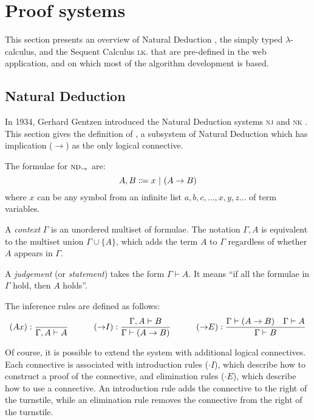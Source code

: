 \section{Proof systems}
\label{background:proof-systems}
This section presents an overview of Natural Deduction \ndt{}, the simply typed $\lambda$-calculus, and the Sequent Calculus \textsc{lk}. that are pre-defined in the web application, and on which most of the algorithm development is based.

\subsection{Natural Deduction \texorpdfstring{\ndt{}}{with implication}}
In 1934, Gerhard Gentzen introduced the Natural Deduction systems \textsc{nj} and \textsc{nk} \cite{gentzen:1969}. This section gives the definition of \ndt{}, a subsystem of Natural Deduction which has implication ($\to$) as the only logical connective.
\begin{definition}
    The formulae for $\textsc{nd}_\to$ are:
    \[
        A, B \Coloneqq x \ |\  (A \to B)
    \]
    where $x$ can be any symbol from an infinite list $a, b, c, \ldots, x, y, z \ldots$ of term variables.
\end{definition}
\begin{definition}
    A \textit{context} $\Gamma$ is an unordered multiset of formulae. The notation $\Gamma, A$ is equivalent to the multiset union $\Gamma \cup \{ A \}$, which adds the term $A$ to $\Gamma$ regardless of whether $A$ appears in $\Gamma$.
\end{definition}
\begin{definition}
    A \textit{judgement} (or \textit{statement}) takes the form $\Gamma \vdash A$. It means ``if all the formulae in $\Gamma$ hold, then $A$ holds''.
\end{definition}
\begin{definition}
    The inference rules are defined as follows:
    {
        \derivationfont
        \[
            (Ax): \frac{}{\Gamma, A \vdash A} \quad\quad\quad (\mathord{\to} I): \frac{\Gamma, A \vdash B}{\Gamma \vdash (A \to B)} \quad\quad\quad (\mathord{\to} E): \frac{\Gamma \vdash (A \to B) \quad \Gamma \vdash A}{\Gamma \vdash B}
        \]
    }%
\end{definition}
Of course, it is possible to extend the system with additional logical connectives. Each connective is associated with introduction rules ($\cdot I$), which describe how to construct a proof of the connective, and elimination rules ($\cdot E$), which describe how to use a connective. An introduction rule adds the connective to the right of the turnstile, while an elimination rule removes the connective from the right of the turnstile.

